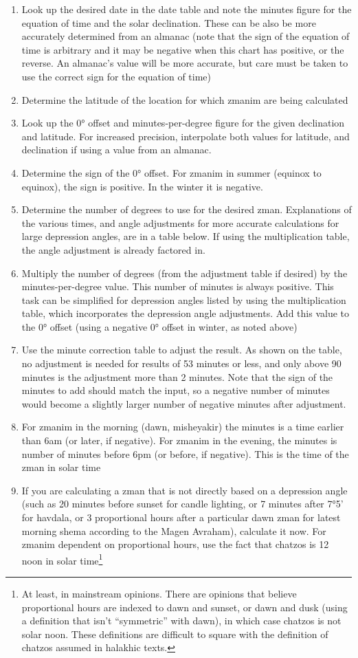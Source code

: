 \begin{enumerate}
	\item Look up the desired date in the date table and note the minutes figure for the equation of time and the solar declination. These can be also be more accurately determined from an almanac (note that the sign of the equation of time is arbitrary and it may be negative when this chart has positive, or the reverse. An almanac's value will be more accurate, but care must be taken to use the correct sign for the equation of time)
	\item Determine the latitude of the location for which zmanim are being calculated
	\item Look up the 0° offset and minutes-per-degree figure for the given declination and latitude. For increased precision, interpolate both values for latitude, and declination if using a value from an almanac.
	\item Determine the sign of the 0° offset. For zmanim in summer (equinox to equinox), the sign is positive. In the winter it is negative.
	\item Determine the number of degrees to use for the desired zman. Explanations of the various times, and angle adjustments for more accurate calculations for large depression angles, are in a table below. If using the multiplication table, the angle adjustment is already factored in.
	\item Multiply the number of degrees (from the adjustment table if desired) by the minutes-per-degree value. This number of minutes is always positive. This task can be simplified for depression angles listed by using the multiplication table, which incorporates the depression angle adjustments. Add this value to the 0° offset (using a negative 0° offset in winter, as noted above)
	\item Use the minute correction table to adjust the result. As shown on the table, no adjustment is needed for results of 53 minutes or less, and only above 90 minutes is the adjustment more than 2 minutes.  Note that the sign of the minutes to add should match the input, so a negative number of minutes would become a slightly larger number of negative minutes after adjustment.
	\item For zmanim in the morning (dawn, misheyakir) the minutes is a time earlier than 6am (or later, if negative). For zmanim in the evening, the minutes is number of minutes before 6pm (or before, if negative). This is the time of the zman in solar time
	\item If you are calculating a zman that is not directly based on a depression angle (such as 20 minutes before sunset for candle lighting, or 7 minutes after 7°5' for havdala, or 3 proportional hours after a particular dawn zman for latest morning shema according to the Magen Avraham), calculate it now.  For zmanim dependent on proportional hours, use the fact that chatzos is 12 noon in solar time\footnote{At least, in mainstream opinions. There are opinions that believe proportional hours are indexed to dawn and sunset, or dawn and dusk (using a definition that isn't “symmetric” with dawn), in which case chatzos is not solar noon. These definitions are difficult to square with the definition of chatzos assumed in halakhic texts.}

\end{enumerate}
